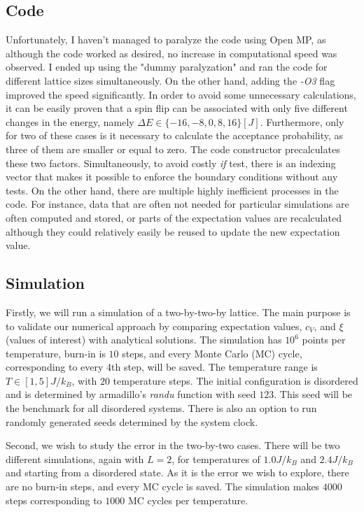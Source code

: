 \documentclass[english,notitlepage,reprint,nofootinbib]{revtex4-1}  %
\begin{document}
\subsection{Code}
Unfortunately, I haven't managed to paralyze the code using Open MP, as although the code worked as desired, no increase in computational speed was observed. I ended up using the "dummy paralyzation" and ran the code for different lattice sizes simultaneously. On the other hand, adding the \textit{-O3} flag improved the speed significantly.
In order to avoid some unnecessary calculations, it can be easily proven that a spin flip can be associated with only five different changes in the energy, namely $\Delta E \in \{ -16,-8,0,8,16\}[J]$. Furthermore, only for two of these cases is it necessary to calculate the acceptance probability, as three of them are smaller or equal to zero. The code constructor precalculates these two factors. Simultaneously, to avoid costly \textit{if} test, there is an indexing vector that makes it possible to enforce the boundary conditions without any tests.
On the other hand, there are multiple highly inefficient processes in the code. For instance, data that are often not needed for particular simulations are often computed and stored, or parts of the expectation values are recalculated although they could relatively easily be reused to update the new expectation value.


\subsection{Simulation}
Firstly, we will run a simulation of a two-by-two-by lattice. The main purpose is to validate our numerical approach by comparing expectation values, $c_V$, and $\xi$ (values of interest) with analytical solutions. The simulation has $10^6$ points per temperature, burn-in is $10$ steps, and every Monte Carlo (MC) cycle, corresponding to every 4th step, will be saved. The temperature range is $T \in [1,5] J/k_B$, with $20$ temperature steps. The initial configuration is disordered and is determined by armadillo's \textit{randu} function with seed $123$. This seed will be the benchmark for all disordered systems. There is also an option to run randomly generated seeds determined by the system clock.

Second, we wish to study the error in the two-by-two cases. There will be two different simulations, again with $L=2$, for temperatures of $1.0 J/k_B$ and $2.4 J/k_B$ and starting from a disordered state. As it is the error we wish to explore, there are no burn-in steps, and every MC cycle is saved. The simulation makes $4000$ steps corresponding to $1000$ MC cycles per temperature.
\end{document}
